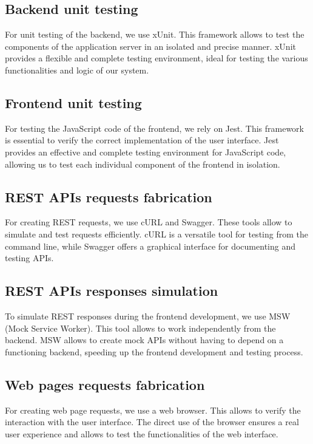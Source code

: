 \subsection{Backend unit testing}

For unit testing of the backend, we use xUnit.
This framework allows to test the components of the application server in an isolated and precise manner.
xUnit provides a flexible and complete testing environment, ideal for testing the various functionalities and logic of our system.

\subsection{Frontend unit testing}

For testing the JavaScript code of the frontend, we rely on Jest.
This framework is essential to verify the correct implementation of the user interface.
Jest provides an effective and complete testing environment for JavaScript code, allowing us to test each individual component of the frontend in isolation.

\subsection{REST APIs requests fabrication}

For creating REST requests, we use cURL and Swagger.
These tools allow to simulate and test requests efficiently.
cURL is a versatile tool for testing from the command line, while Swagger offers a graphical interface for documenting and testing APIs.

\subsection{REST APIs responses simulation}

To simulate REST responses during the frontend development, we use MSW (Mock Service Worker).
This tool allows to work independently from the backend.
MSW allows to create mock APIs without having to depend on a functioning backend, speeding up the frontend development and testing process.

\subsection{Web pages requests fabrication}

For creating web page requests, we use a web browser.
This allows to verify the interaction with the user interface.
The direct use of the browser ensures a real user experience and allows to test the functionalities of the web interface.

